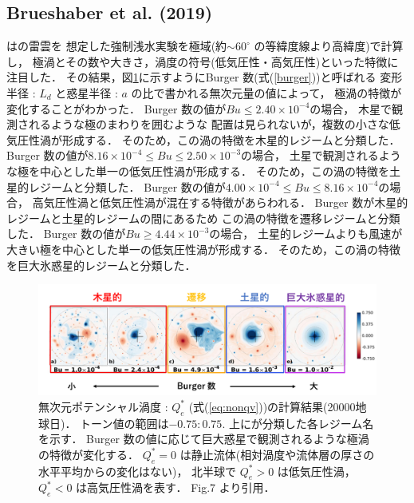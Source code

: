 \documentclass[a4j,12pt,openbib,oneside]{jreport}
\begin{document}
\subsection{Brueshaber et al. (2019)}
\label{sec:intro22}
\cite{Brueshaber2019}は\cite{Showman2007}の雷雲を
想定した強制浅水実験を極域(約$\sim 60^\circ$ の等緯度線より高緯度)で計算し，
極渦とその数や大きさ，渦度の符号(低気圧性・高気圧性)といった特徴に注目した．
その結果，図\ref{fig4}に示すようにBurger 数(式(\ref{burger}))と呼ばれる
変形半径 : $L_{d}$ と惑星半径 : $a$ の比で書かれる無次元量の値によって，
極渦の特徴が変化することがわかった．
%
Burger 数の値が$Bu \leq 2.40 \times 10^{-4}$の場合，
木星で観測されるような極のまわりを囲むような
配置は見られないが，複数の小さな低気圧性渦が形成する．
そのため，この渦の特徴を木星的レジームと分類した．
%
Burger 数の値が$8.16 \times 10^{-4 } \leq Bu \leq  2.50 \times 10^{-3}$の場合，
土星で観測されるような極を中心とした単一の低気圧性渦が形成する．
そのため，この渦の特徴を土星的レジームと分類した．
%
Burger 数の値が$4.00 \times 10^{-4 } \leq  Bu \leq  8.16 \times 10^{-4}$の場合，
高気圧性渦と低気圧性渦が混在する特徴があらわれる．
Burger 数が木星的レジームと土星的レジームの間にあるため
この渦の特徴を遷移レジームと分類した．
%
Burger 数の値が$Bu \geq 4.44 \times 10^{-3 }$の場合，
土星的レジームよりも風速が大きい極を中心とした単一の低気圧性渦が形成する．
そのため，この渦の特徴を巨大氷惑星的レジームと分類した．
%
\begin{figure}[H]
  \begin{center}
    \includegraphics[clip,width=14cm]{./fig/intro/fig4_2.png}
    \caption{
      \footnotesize{無次元ポテンシャル渦度 : $Q_e^*$ (式(\ref{eq:nonqv}))の計算結果(20000地球日)．
トーン値の範囲は$-0.75 : 0.75$.
上に\cite{Brueshaber2019}が分類した各レジーム名を示す．
Burger 数の値に応じて巨大惑星で観測されるような極渦の特徴が変化する．
$Q_e^* = 0$ は静止流体(相対渦度や流体層の厚さの水平平均からの変化はない)，
北半球で $Q_e^* > 0$ は低気圧性渦，$Q_e^* < 0$ は高気圧性渦を表す．
\cite{Brueshaber2019} Fig.7 より引用．
      }
    }
    \label{fig4}
  \end{center}
\end{figure}
%
\def\intro3{研究目的}
\end{document}
